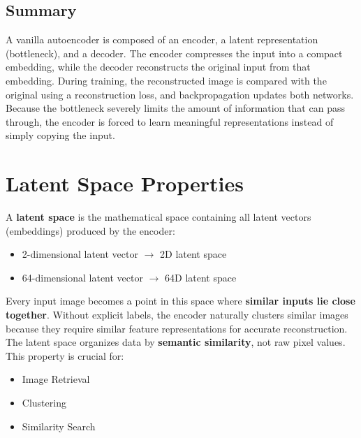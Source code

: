 \subsection*{Summary}
A vanilla autoencoder is composed of an encoder, a latent representation (bottleneck), and a decoder. The encoder compresses the input into a compact embedding, while the decoder reconstructs the original input from that embedding. During training, the reconstructed image is compared with the original using a reconstruction loss, and backpropagation updates both networks. Because the bottleneck severely limits the amount of information that can pass through, the encoder is forced to learn meaningful representations instead of simply copying the input.

\section{Latent Space Properties}

A \textbf{latent space} is the mathematical space containing all latent vectors (embeddings) produced by the encoder:
\begin{itemize}
    \item 2-dimensional latent vector $\longrightarrow$ 2D latent space
    \item 64-dimensional latent vector $\longrightarrow$ 64D latent space
\end{itemize}

Every input image becomes a point in this space where \textbf{similar inputs lie close together}. Without explicit labels, the encoder naturally clusters similar images because they require similar feature representations for accurate reconstruction. The latent space organizes data by \textbf{semantic similarity}, not raw pixel values. This property is crucial for:
\begin{itemize}
    \item Image Retrieval
    \item Clustering
    \item Similarity Search
\end{itemize}


